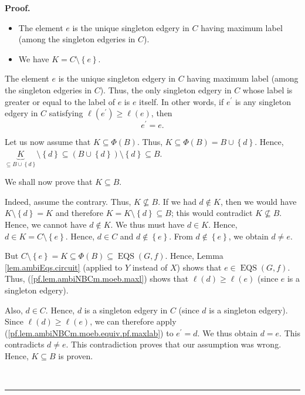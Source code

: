 \documentclass[numbers=enddot,12pt,final,onecolumn,notitlepage]{scrartcl}%
\theoremstyle{definition}
\newenvironment{proof}[1][Proof]{\noindent\textbf{#1.} }{\ \rule{0.5em}{0.5em}}
\newenvironment{verlong}{}{}
\begin{document}
\begin{proof}
\begin{verlong}
\begin{itemize}
\item The element $e$ is the unique singleton edgery in $C$ having maximum
label (among the singleton edgeries in $C$).

\item We have $K=C\setminus\left\{  e\right\}  $.
\end{itemize}

The element $e$ is the unique singleton edgery in $C$ having maximum label
(among the singleton edgeries in $C$). Thus, the only singleton edgery in $C$
whose label is greater or equal to the label of $e$ is $e$ itself. In other
words, if $e^{\prime}$ is any singleton edgery in $C$ satisfying $\ell\left(
e^{\prime}\right)  \geq\ell\left(  e\right)  $, then%
\begin{equation}
e^{\prime}=e. \label{pf.lem.ambiNBCm.moeb.equiv.pf.maxlab}%
\end{equation}


Let us now assume that $K\subseteq\Phi\left(  B\right)  $. Thus,
$K\subseteq\Phi\left(  B\right)  =B\cup\left\{  d\right\}  $. Hence,
$\underbrace{K}_{\subseteq B\cup\left\{  d\right\}  }\setminus\left\{
d\right\}  \subseteq\left(  B\cup\left\{  d\right\}  \right)  \setminus
\left\{  d\right\}  \subseteq B$.

We shall now prove that $K\subseteq B$.

Indeed, assume the contrary. Thus, $K\not \subseteq B$. If we had $d\notin K$,
then we would have $K\setminus\left\{  d\right\}  =K$ and therefore
$K=K\setminus\left\{  d\right\}  \subseteq B$; this would contradict
$K\not \subseteq B$. Hence, we cannot have $d\notin K$. We thus must have
$d\in K$. Hence, $d\in K=C\setminus\left\{  e\right\}  $. Hence, $d\in C$ and
$d\notin\left\{  e\right\}  $. From $d\notin\left\{  e\right\}  $, we obtain
$d\neq e$.

But $C\setminus\left\{  e\right\}  =K\subseteq\Phi\left(  B\right)
\subseteq\operatorname*{EQS}\left(  G,f\right)  $. Hence, Lemma
\ref{lem.ambiEqs.circuit} (applied to $Y$ instead of $X$) shows that
$e\in\operatorname*{EQS}\left(  G,f\right)  $. Thus,
(\ref{pf.lem.ambiNBCm.moeb.maxl}) shows that $\ell\left(  d\right)  \geq
\ell\left(  e\right)  $ (since $e$ is a singleton edgery).

Also, $d\in C$. Hence, $d$ is a singleton edgery in $C$ (since $d$ is a
singleton edgery). Since $\ell\left(  d\right)  \geq\ell\left(  e\right)  $,
we can therefore apply (\ref{pf.lem.ambiNBCm.moeb.equiv.pf.maxlab}) to
$e^{\prime}=d$. We thus obtain $d=e$. This contradicts $d\neq e$. This
contradiction proves that our assumption was wrong. Hence, $K\subseteq B$ is proven.


\end{verlong}
\end{proof}
\end{document}
